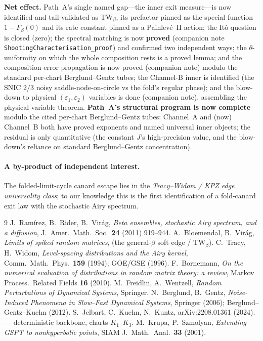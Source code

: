 \documentclass[11pt]{article}
\theoremstyle{remark}
\newcommand{\TW}{\mathrm{TW}}
\begin{document}
\noindent\textbf{Net effect.} Path~A's single named gap---the inner exit
measure---is now identified and tail-validated as $\TW_\beta$, its prefactor pinned as
the special function $1-F_\beta(0)$ and its rate constant pinned as a Painlev\'e~II
action; the It\^o question is closed (zero); the spectral matching is now \textbf{proved}
(companion note \texttt{ShootingCharacterisation\_proof}) and confirmed two independent
ways; the $\theta$-uniformity on which the whole composition rests is a proved lemma; and
the composition error propagation is now proved (companion note) modulo the standard
per-chart Berglund--Gentz tubes; the Channel-B inner is identified (the SNIC $2/3$
noisy saddle-node-on-circle vs the fold's regular phase); and the blow-down to physical
$(\varepsilon_1,\varepsilon_2)$ variables is done (companion note), assembling the
physical-variable theorem. \textbf{Path~A's structural program is now complete} modulo the
cited per-chart Berglund--Gentz tubes: Channel~A and (now) Channel~B both have proved
exponents and named universal inner objects; the residual is only quantitative (the
constant $J$'s high-precision value, and the blow-down's reliance on standard
Berglund--Gentz concentration).

\paragraph{A by-product of independent interest.} The folded-limit-cycle canard escape
lies in the \emph{Tracy--Widom / KPZ edge universality class}; to our knowledge this is
the first identification of a fold-canard exit law with the stochastic Airy spectrum.

\begin{thebibliography}{9}
 J.~Ram\'irez, B.~Rider, B.~Vir\'ag, \emph{Beta ensembles, stochastic
Airy spectrum, and a diffusion}, J.\ Amer.\ Math.\ Soc.\ \textbf{24} (2011) 919--944.
 A.~Bloemendal, B.~Vir\'ag, \emph{Limits of spiked random matrices}, (the
general-$\beta$ soft edge / $\TW_\beta$).
 C.~Tracy, H.~Widom, \emph{Level-spacing distributions and the Airy
kernel}, Comm.\ Math.\ Phys.\ \textbf{159} (1994); GOE/GSE (1996).
 F.~Bornemann, \emph{On the numerical evaluation of distributions in
random matrix theory: a review}, Markov Process.\ Related Fields \textbf{16} (2010).
 M.~Freidlin, A.~Wentzell, \emph{Random Perturbations of Dynamical
Systems}, Springer.
 N.~Berglund, B.~Gentz, \emph{Noise-Induced Phenomena in Slow--Fast
Dynamical Systems}, Springer (2006); Berglund--Gentz--Kuehn (2012).
 S.~Jelbart, C.~Kuehn, N.~Kuntz, arXiv:2208.01361 (2024). --- deterministic
backbone, charts $K_1$--$K_3$.
 M.~Krupa, P.~Szmolyan, \emph{Extending GSPT to nonhyperbolic points}, SIAM
J.\ Math.\ Anal.\ \textbf{33} (2001).
\end{thebibliography}
\end{document}

